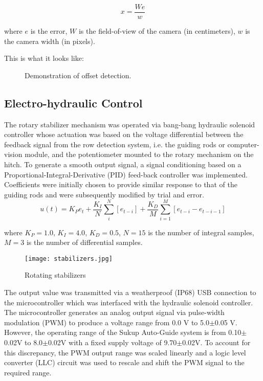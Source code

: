 \begin{equation}
  x = \frac{We}{w}
  \label{eq:px2mm}
\end{equation}
\begin{flushleft}
where $e$ is the error, $W$ is the field-of-view of the camera (in
centimeters), $w$ is the camera width (in pixels).
\end{flushleft}

This is what it looks like:

\begin{figure}
  \centering
  \caption{Demonstration of offset detection.}
  \label{fig:row_estimation}
\end{figure}

\subsection{Electro-hydraulic Control}
The rotary stabilizer mechanism was operated via bang-bang hydraulic
solenoid controller whose actuation was based on the voltage
differential between the feedback signal from the row detection
system, i.e. the guiding rods or computer-vision module, and the
potentiometer mounted to the rotary mechanism on the hitch. 
To generate a smooth output signal, a signal conditioning based on a
Proportional-Integral-Derivative (PID) feed-back controller was
implemented. Coefficients were initially chosen to provide similar
response to that of the guiding rods and were subsequently modified by
trial and error.
\begin{equation}
    u(t) = K_{P}e_{t} + \frac{K_{I}}{N}\displaystyle\sum_i^N \left[
      e_{t-i} \right] +
    \frac{K_{D}}{M}\displaystyle\sum_{i=1}^M \left[e_{t-i}-e_{t-i-1}\right]
  \label{eq:pid}
\end{equation}
\begin{flushleft}
where $K_{P}=1.0$, $K_{I}=4.0$, $K_{D}=0.5$, $N=15$ is the number of integral samples,
$M=3$ is the number of differential samples.
\end{flushleft}

\begin{figure}
  \centering
  \texttt{[image: stabilizers.jpg]}
  \caption{Rotating stabilizers}
  \label{fig:stabilizers}
\end{figure}

The output value was transmitted via a weatherproof (IP68) USB
connection to the microcontroller which was interfaced with the
hydraulic solenoid controller. The microcontroller generates an analog
output signal via pulse-width modulation (PWM) to produce a voltage
range from 0.0 V to 5.0$\pm$0.05 V. However, the operating range of the
Sukup Auto-Guide system is from 0.10$\pm$0.02V to 8.0$\pm$0.02V with a fixed
supply voltage of 9.70$\pm$0.02V. To account for this discrepancy, the PWM
output range was scaled linearly and a logic level converter (LLC)
circuit was used to rescale and shift the PWM signal to the required
range.

